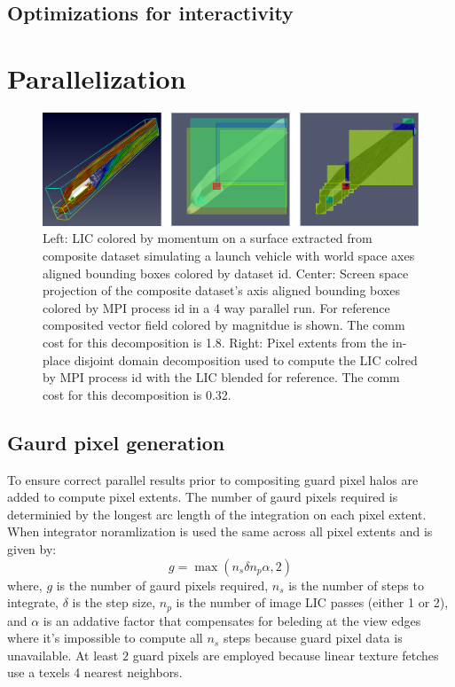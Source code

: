 \documentclass[a4paper,10pt]{article}
\begin{document}
\subsection{Optimizations for interactivity}

\section{Parallelization}
\begin{figure}[ht]
 \centering
 \includegraphics[width=\textwidth]{./images-data/dia-serial/shuttle-surf-par-lg-p-d-space-lic.png}
 \caption{Left: LIC colored by momentum on a surface extracted from composite dataset simulating a launch vehicle\cite{nasa-shuttle} with world space axes aligned bounding boxes colored by dataset id. Center: Screen space projection of the composite dataset's axis aligned bounding boxes colored by MPI process id in a 4 way parallel run. For reference composited vector field colored by magnitdue is shown. The comm cost for this decomposition is 1.8. Right: Pixel extents from the in-place disjoint domain decomposition used to compute the LIC colred by MPI process id with the LIC blended for reference. The comm cost for this decomposition is 0.32.}
 \label{fig:blocks}
\end{figure}




\subsection{Gaurd pixel generation}
To ensure correct parallel results prior to compositing guard pixel halos are added to compute pixel extents. The number of gaurd pixels required is determinied by the longest arc length of the integration on each pixel extent. When integrator noramlization is used the same across all pixel extents and is given by:
\begin{equation}
g = \max( n_s \delta n_p \alpha,  2)
\label{eqn:gaurd-norm}
\end{equation}
where, $g$ is the number of gaurd pixels required, $n_s$ is the number of steps to integrate, $\delta$ is the step size, $n_p$ is the number of image LIC passes (either 1 or 2), and $\alpha$ is an addative factor that compensates for beleding at the view edges where it's impossible to compute all $n_s$ steps because guard pixel data is unavailable. At least $2$ guard pixels are employed because linear texture fetches use a texels 4 nearest neighbors.
\end{document}

